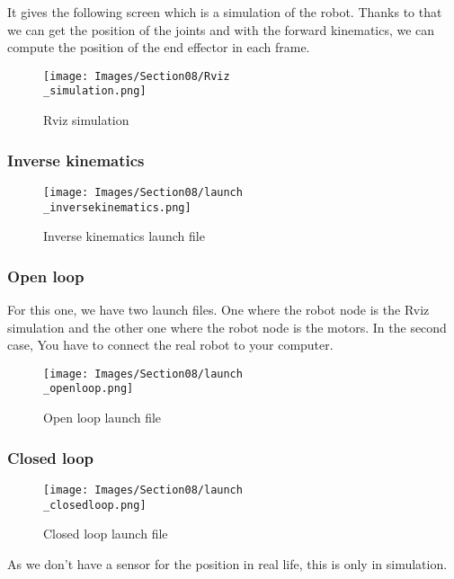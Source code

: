 It gives the following screen which is a simulation of the robot. Thanks to that we can get the position of the joints and with the forward kinematics, we can compute the position of the end effector in each frame.
\begin{figure}[ht]
    \centering
    \texttt{[image: Images/Section08/Rviz\\\_simulation.png]}
    \caption{Rviz simulation}
    \label{fig:RvizSim}
\end{figure}
\FloatBarrier

\subsubsection{Inverse kinematics}
\begin{figure}[ht]
    \centering
    \texttt{[image: Images/Section08/launch\\\_inversekinematics.png]}
    \caption{Inverse kinematics launch file}
    \label{fig:InverseKinLaunch}
\end{figure}
\FloatBarrier

\subsubsection{Open loop}

For this one, we have two launch files. One where the robot node is the Rviz simulation and the other one where the robot node is the motors. In the second case, You have to connect the real robot to your computer.

\begin{figure}[ht]
    \centering
    \texttt{[image: Images/Section08/launch\\\_openloop.png]}
    \caption{Open loop launch file}
    \label{fig:OpenLoopLaunch}
\end{figure}
\FloatBarrier

\subsubsection{Closed loop}
\begin{figure}[ht]
    \centering
    \texttt{[image: Images/Section08/launch\\\_closedloop.png]}
    \caption{Closed loop launch file}
    \label{fig:ClosedLoopLaunch}
\end{figure}
\FloatBarrier

\bigbreak
As we don't have a sensor for the position in real life, this is only in simulation.

